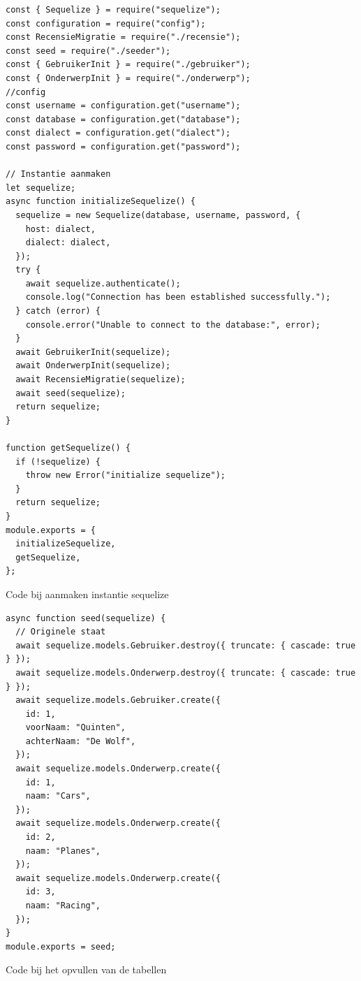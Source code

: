 \begin{listing}[H]
  \centering
  \begin{verbatim}
const { Sequelize } = require("sequelize");
const configuration = require("config");
const RecensieMigratie = require("./recensie");
const seed = require("./seeder");
const { GebruikerInit } = require("./gebruiker");
const { OnderwerpInit } = require("./onderwerp");
//config
const username = configuration.get("username");
const database = configuration.get("database");
const dialect = configuration.get("dialect");
const password = configuration.get("password");

// Instantie aanmaken
let sequelize;
async function initializeSequelize() {
  sequelize = new Sequelize(database, username, password, {
    host: dialect,
    dialect: dialect,
  });
  try {
    await sequelize.authenticate();
    console.log("Connection has been established successfully.");
  } catch (error) {
    console.error("Unable to connect to the database:", error);
  }
  await GebruikerInit(sequelize);
  await OnderwerpInit(sequelize);
  await RecensieMigratie(sequelize);
  await seed(sequelize);
  return sequelize;
}

function getSequelize() {
  if (!sequelize) {
    throw new Error("initialize sequelize");
  }
  return sequelize;
}
module.exports = {
  initializeSequelize,
  getSequelize,
};
\end{verbatim}
\caption{\label{code:Instantie}Code bij aanmaken instantie sequelize}
\end{listing}

\begin{listing}[H]
  \centering
  \begin{verbatim}
async function seed(sequelize) {
  // Originele staat
  await sequelize.models.Gebruiker.destroy({ truncate: { cascade: true } });
  await sequelize.models.Onderwerp.destroy({ truncate: { cascade: true } });
  await sequelize.models.Gebruiker.create({
    id: 1,
    voorNaam: "Quinten",
    achterNaam: "De Wolf",
  });
  await sequelize.models.Onderwerp.create({
    id: 1,
    naam: "Cars",
  });
  await sequelize.models.Onderwerp.create({
    id: 2,
    naam: "Planes",
  });
  await sequelize.models.Onderwerp.create({
    id: 3,
    naam: "Racing",
  });
}
module.exports = seed;
\end{verbatim}
\caption{\label{code:Seed}Code bij het opvullen van de tabellen}
\end{listing}

